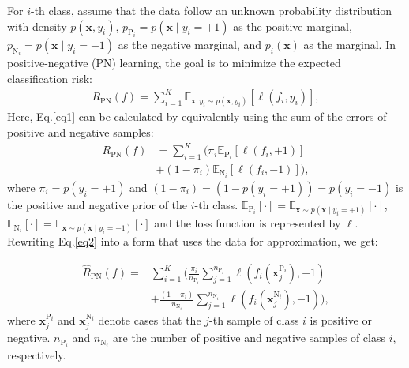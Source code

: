 \documentclass[11pt]{article}
\begin{document}
For $i$-th class, assume that the data follow an unknown probability distribution with density $p(\boldsymbol{x}, y_{i})$, $p_{\mathrm{P}_{i}}=p(\boldsymbol{x} \mid y_{i}=+1)$ as the positive marginal, $p_{\mathrm{N}_{i}}=p(\boldsymbol{x} \mid y_{i}=-1)$ as the negative marginal, and $p_{i}(\boldsymbol{x})$ as the marginal. In positive-negative (PN) learning, the goal is to minimize the expected classification risk:
\begin{equation}
\begin{aligned}\label{eq1}
R_{\mathrm{PN}}(f)=\sum_{i=1}^{K}\mathbb{E}_{\boldsymbol{x},y_{i} \sim p(\boldsymbol{x}, y_{i})}[\ell(f_{i}, y_{i})],
\end{aligned}
\end{equation}
Here, Eq.\ref{eq1} can be calculated by equivalently using the sum of the errors of positive and negative samples:
\begin{equation}
\begin{aligned}\label{eq2}
R_{\mathrm{PN}}(f)&=\sum_{i=1}^{K}(\pi_{i} \mathbb{E}_{\mathrm{P}_{i}}[\ell(f_{i}, +1)]\\&+(1-\pi_{i})\mathbb{E}_{\mathrm{N}_{i}}[\ell(f_{i}, -1)]),
\end{aligned}
\end{equation}
where $\pi_{i}=p(y_{i}=+1)$ and $(1-\pi_{i})=(1-p(y_{i}=+1))=p(y_{i}=-1)$ is the positive and negative prior of the $i$-th class. $\mathbb{E}_{\mathrm{P}_{i}}[\cdot]=\mathbb{E}_{\boldsymbol{x} \sim p(\boldsymbol{x} \mid y_{i}=+1)}[\cdot]$, $\mathbb{E}_{\mathrm{N}_{i}}[\cdot]=\mathbb{E}_{\boldsymbol{x} \sim p(\boldsymbol{x} \mid y_{i}=-1)}[\cdot]$ and the loss function is represented by $\ell$. Rewriting Eq.\ref{eq2} into a form that uses the data for approximation, we get:

\begin{equation}
\begin{aligned}\label{eq3}
\widehat{R}_{\mathrm{PN}}(f)=&\sum_{i=1}^{K}(\frac{\pi_{i}}{n_{\mathrm{P}_{i}}} \sum_{j=1}^{n_{\mathrm{P}_{i}}} \ell(f_{i}( \boldsymbol{x}_{j}^{\mathrm{P}_{i}}), +1) \\
&+\frac{(1-\pi_{i})}{n_{\mathrm{N}_{i}}} \sum_{j=1}^{n_{\mathrm{N}_{i}}} \ell(f_{i}( \boldsymbol{x}_{j}^{\mathrm{N}_{i}}), -1)),
\end{aligned}
\end{equation}
where $\boldsymbol{x}_{j}^{\mathrm{P}_{i}}$ and $\boldsymbol{x}_{j}^{\mathrm{N}_{i}}$ denote cases that the $j$-th sample of class $i$ is positive or negative. $n_{\mathrm{P}_{i}}$ and $n_{\mathrm{N}_{i}}$ are the number of positive and negative samples of class $i$, respectively.
\end{document}
